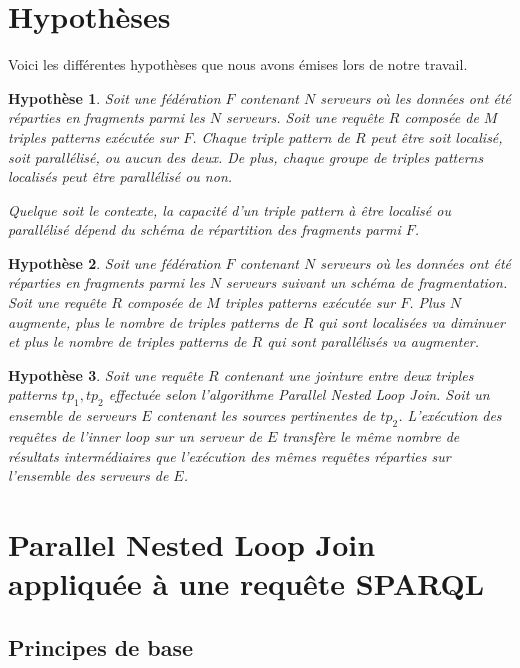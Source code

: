 \documentclass[a4paper]{article}
\newtheorem{hypo}{Hypothèse}
\begin{document}
\section{Hypothèses}

Voici les différentes hypothèses que nous avons émises lors de notre travail.

\begin{hypo}\label{hypo:localityANDparallel}
Soit une fédération $F$ contenant $N$ serveurs où les données ont été réparties en fragments parmi les $N$ serveurs. Soit une requête $R$ composée de $M$ triples patterns exécutée sur $F$. Chaque triple pattern de $R$ peut être soit localisé, soit parallélisé, ou aucun des deux. De plus, chaque groupe de triples patterns localisés peut être parallélisé ou non. 

Quelque soit le contexte, la capacité d'un triple pattern à être localisé ou parallélisé dépend du schéma de répartition des fragments parmi $F$.
\end{hypo}

\begin{hypo}\label{hypo:localityVSparallel}
Soit une fédération $F$ contenant $N$ serveurs où les données ont été réparties en fragments parmi les $N$ serveurs suivant un schéma de fragmentation. Soit une requête $R$ composée de $M$ triples patterns exécutée sur $F$. Plus $N$ augmente, plus le nombre de triples patterns de $R$ qui sont localisées va diminuer et plus le nombre de triples patterns de $R$ qui sont parallélisés va augmenter. 
\end{hypo}

\begin{hypo}\label{hypo:stableTuples}
Soit une requête $R$ contenant une jointure entre deux triples patterns $tp_1, tp_2$ effectuée selon l'algorithme Parallel Nested Loop Join. Soit un ensemble de serveurs $E$ contenant les sources pertinentes de $tp_2$. L'exécution des requêtes de l'inner loop sur un serveur de $E$ transfère le même nombre de résultats intermédiaires que l'exécution des mêmes requêtes réparties sur l'ensemble des serveurs de $E$.
\end{hypo}

\section{Parallel Nested Loop Join appliquée à une requête SPARQL}

\subsection{Principes de base}
\end{document}
